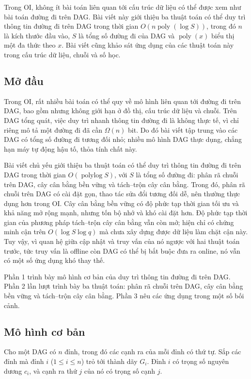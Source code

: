 \documentclass[11pt]{article}
\begin{document}
Trong OI, không ít bài toán liên quan tới cấu trúc dữ liệu có thể được xem như
bài toán đường đi trên DAG. Bài viết này giới thiệu ba thuật toán có thể duy
trì thông tin đường đi trên DAG trong thời gian $O(n\operatorname{poly}(\log
S))$, trong đó $n$ là kích thước đầu vào, $S$ là tổng số đường đi của DAG và
$\operatorname{poly}(x)$ biểu thị một đa thức theo $x$. Bài viết cũng khảo sát
ứng dụng của các thuật toán này trong cấu trúc dữ liệu, chuỗi và số học.

\subsection*{Mở đầu}

Trong OI, rất nhiều bài toán có thể quy về mô hình liên quan tới đường đi trên
DAG, bao gồm nhưng không giới hạn ở đồ thị, cấu trúc dữ liệu và chuỗi. Trên DAG
tổng quát, việc duy trì nhanh thông tin đường đi là không thực tế, vì chỉ riêng
mô tả một đường đi đã cần $\Omega(n)$ bit. Do đó bài viết tập trung vào các DAG
có tổng số đường đi tương đối nhỏ; nhiều mô hình DAG thực dụng, chẳng hạn máy tự
động hậu tố, thỏa tính chất này.

Bài viết chủ yếu giới thiệu ba thuật toán có thể duy trì thông tin đường đi
trên DAG trong thời gian $O(\operatorname{polylog} S)$, với $S$ là tổng số đường
đi: phân rã chuỗi trên DAG, cây cân bằng bền vững và tách--trộn cây cân bằng.
Trong đó, phân rã chuỗi trên DAG có cài đặt gọn, thao tác sửa đổi tương đối dễ,
nên thường thực dụng hơn trong OI. Cây cân bằng bền vững có độ phức tạp thời
gian tối ưu và khả năng mở rộng mạnh, nhưng tốn bộ nhớ và khó cài đặt hơn. Độ
phức tạp thời gian của phương pháp tách--trộn cây cân bằng vẫn còn mở; hiện chỉ
có chứng minh cận trên $O(\log S\log q)$ mà chưa xây dựng được dữ liệu làm chặt
cận này. Tuy vậy, vì quan hệ giữa cập nhật và truy vấn của nó ngược với hai thuật
toán trước, tức truy vấn là offline còn DAG có thể bị bắt buộc đưa ra online,
nó vẫn có một số ứng dụng khó thay thế.

Phần 1 trình bày mô hình cơ bản của duy trì thông tin đường đi trên DAG. Phần 2
lần lượt trình bày ba thuật toán: phân rã chuỗi trên DAG, cây cân bằng bền vững
và tách--trộn cây cân bằng. Phần 3 nêu các ứng dụng trong một số bối cảnh.

\subsection{Mô hình cơ bản}

Cho một DAG có $n$ đỉnh, trong đó các cạnh ra của mỗi đỉnh có thứ tự. Sắp các
đỉnh mà đỉnh $i$ ($1\le i\le n$) trỏ tới thành dãy $G_i$. Đỉnh $i$ có trọng số
nguyên dương $c_i$, và cạnh ra thứ $j$ của nó có trọng số cạnh $j$.
\end{document}
